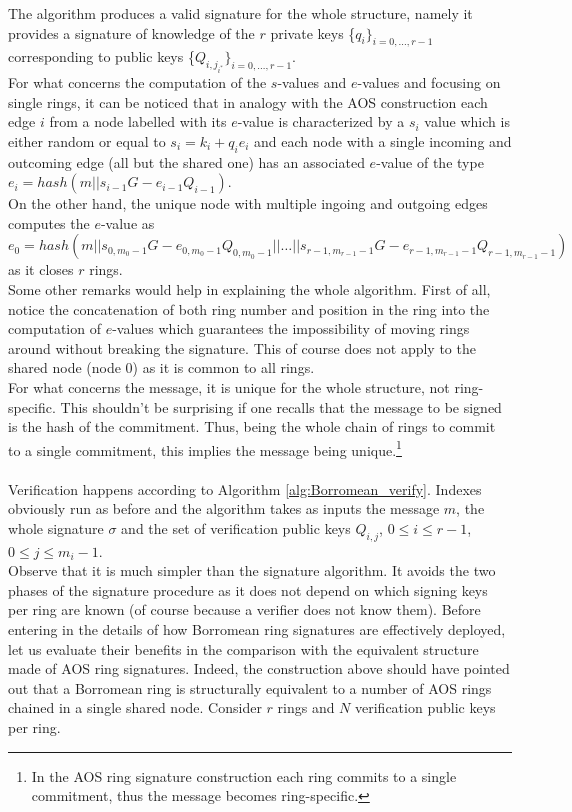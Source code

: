 \noindent
The algorithm produces a valid signature for the whole structure, namely it provides a signature of knowledge of the $r$ private keys \{$q_{i}\}_{i=0,\dots,r-1}$ corresponding to public keys \{$Q_{i,j_{i^{*}}}\}_{i=0,\dots,r-1}$.\\
For what concerns the computation of the $s$-values and $e$-values and focusing on single rings, it can be noticed that in analogy with the AOS construction each edge $i$ from a node labelled with its $e$-value is characterized by a $s_i$ value which is either random or equal to $s_i = k_i + q_ie_i$ and each node with a single incoming and outcoming edge (all but the shared one) has an associated $e$-value of the type $e_i = hash(m||s_{i-1}G - e_{i-1}Q_{i-1})$.\\
On the other hand, the unique node with multiple ingoing and outgoing edges computes the $e$-value as $e_0 = hash(m||s_{0,m_0-1}G - e_{0,m_0-1}Q_{0,m_0-1}||\dots||s_{{r-1},{m_{r-1}-1}}G - e_{{r-1},{m_{r-1}-1}}Q_{{r-1},{m_{r-1}-1}})$ as it closes $r$ rings.\\
Some other remarks would help in explaining the whole algorithm. First of all, notice the concatenation of both ring number and position in the ring into the computation of $e$-values which guarantees the impossibility of moving rings around without breaking the signature. This of course does not apply to the shared node (node 0) as it is common to all rings.\\
For what concerns the message, it is unique for the whole structure, not ring-specific. This shouldn't be surprising if one recalls that the message to be signed is the hash of the commitment. Thus, being the whole chain of rings to commit to a single commitment, this implies the message being unique.\footnote{In the AOS ring signature construction each ring commits to a single commitment, thus the message becomes ring-specific.}
\\ \ \\
Verification happens according to Algorithm \ref{alg:Borromean_verify}. Indexes obviously run as before and the algorithm takes as inputs the message $m$, the whole signature $\sigma$ and the set of verification public keys $Q_{i,j}$, $0 \leq i \leq r-1$, $0 \leq j \leq m_i-1$.\\
Observe that it is much simpler than the signature algorithm. It avoids the two phases of the signature procedure as it does not depend on which signing keys per ring are known (of course because a verifier does not know them).
Before entering in the details of how Borromean ring signatures are effectively deployed, let us evaluate their benefits in the comparison with the equivalent structure made of AOS ring signatures. Indeed, the construction above should have pointed out that a Borromean ring is structurally equivalent to a number of AOS rings chained in a single shared node. Consider $r$ rings and $N$ verification public keys per ring.
